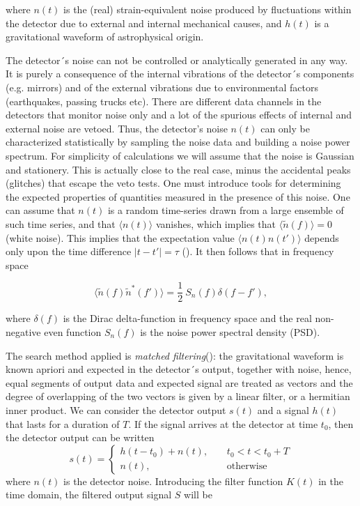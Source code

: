 \documentclass[epsf]{article}
\begin{document}
where $n(t)$ is the (real) strain-equivalent noise produced by
fluctuations within the detector due to external and internal mechanical causes, and $h(t)$ is a
 gravitational waveform of astrophysical origin.

The detector´s noise can not be controlled or analytically generated in any way. It is purely a consequence of 
the internal vibrations of the detector´s components (e.g. mirrors) and of the external vibrations due to 
environmental factors (earthquakes, passing trucks etc). There are different data channels in the detectors that monitor noise only and a lot of the spurious effects of internal and external noise are vetoed. Thus, the detector's noise $n(t)$ can only be characterized
statistically by sampling the noise data and building a noise power spectrum. For simplicity of calculations we will assume that the noise is Gaussian and stationery. This is actually close to the real case, minus the accidental peaks (glitches) that escape the veto tests. 
One must introduce tools for determining the expected
properties of quantities measured in the presence of this noise.
One can assume that $n(t)$ is a random time-series drawn from a large
ensemble of such time series, and that $\langle n(t) \rangle $ vanishes, which implies that
$\langle \tilde n(f) \rangle =0$ (white noise). This implies that the
expectation value $\langle n(t) n(t') \rangle$ depends only upon the
time difference $|t-t'|= \tau$ (\cite{allen,maggiore,cre}). It then follows that in frequency space

\begin{equation}
\langle \tilde n(f) \tilde n^*(f') \rangle = \frac{1}{2}~ S_n(f) \delta(f-f'),
\end{equation}

where $\delta(f)$ is the Dirac delta-function in frequency space and the real non-negative even function $S_n(f)$ is the noise power spectral density (PSD).

The search method applied is {\it matched filtering}(\cite{allen,maggiore,cre,abbott2007}): the gravitational waveform is known apriori and expected in the detector´s output, together with noise, hence, equal segments of output data and expected signal are treated as vectors and the degree of overlapping of the two vectors is given by a linear filter, or a hermitian inner product.  
We can consider the detector output $s(t)$ and a signal $h(t)$ that
lasts for a duration of $T$.  If the signal arrives at the detector at time
$t_0$, then the detector output can be written
\begin{equation}
    s(t)=\left\{  
    \begin{array}{lc}
        h(t-t_0)+n(t), ~ ~ ~ ~ ~& t_0<t<t_0+T\\
        n(t), & \mbox{otherwise}
    \end{array}
    \right. 
    \label{eq:h(t)}
\end{equation}
where $n(t)$ is the detector noise. Introducing the filter function $K(t)$ in the time domain, the filtered output signal $S$ will be 
\end{document}
